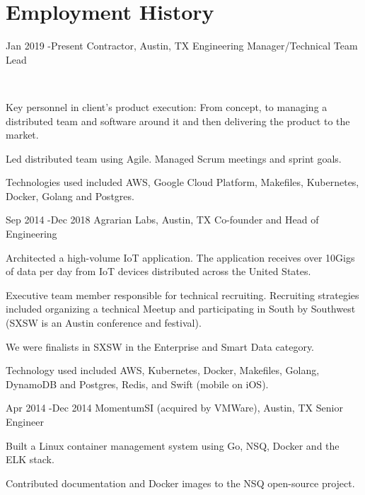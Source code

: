 \documentclass[10pt]{article} %
\begin{document}

\section{Employment History}

\job
{Jan 2019 -}{Present}
{Contractor, Austin, TX}
{}
{Engineering Manager/Technical Team Lead}
{\\

\begin{itemize-noindent}
\item{Key personnel in client's product execution: From concept, to managing a distributed team and software around it and then delivering the product to the market.}
\item{Led distributed team using Agile. Managed Scrum meetings and sprint goals.}
\item{Technologies used included AWS, Google Cloud Platform, Makefiles, Kubernetes, Docker, Golang and Postgres.}
\end{itemize-noindent}
}


\job
{Sep 2014 -}{Dec 2018}
{Agrarian Labs, Austin, TX}
{}
{Co-founder and Head of Engineering}
{

\begin{itemize-noindent}
\item{Architected a high-volume IoT application.  The application receives over 10Gigs of data per day from IoT devices distributed across the United States.}
\item{Executive team member responsible for technical recruiting. Recruiting strategies included organizing a technical Meetup and participating in South by Southwest (SXSW is an Austin conference and festival).}
\item{We were finalists in SXSW in the Enterprise and Smart Data category.}
\item{Technology used included AWS, Kubernetes, Docker, Makefiles, Golang, DynamoDB and Postgres, Redis, and Swift (mobile on iOS).}
\end{itemize-noindent}
}


\job
{Apr 2014 -}{Dec 2014}
{MomentumSI (acquired by VMWare), Austin, TX}
{}
{Senior Engineer}
{
\begin{itemize-noindent}
\item{Built a Linux container management system using Go, NSQ, Docker and the ELK stack.}
\item{Contributed documentation and Docker images to the NSQ open-source project.}
\end{itemize-noindent}
}
\end{document}
